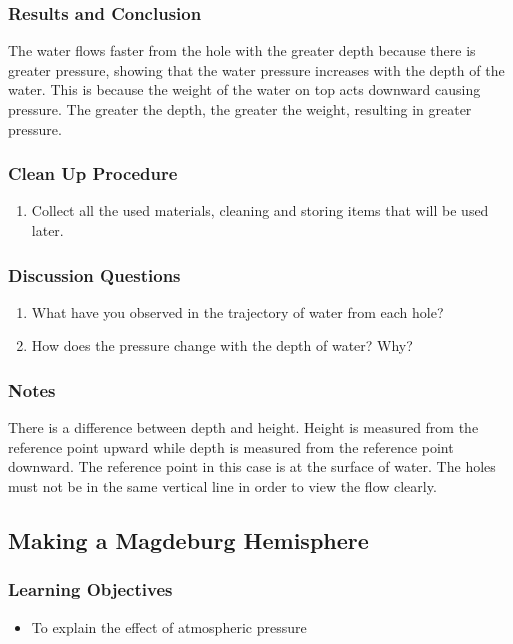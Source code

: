 \subsubsection*{Results and Conclusion}
The water flows faster from the hole with the greater depth because there is greater pressure, showing that the water pressure increases with the depth of the water. This is because the weight of the water on top acts downward causing pressure. The greater the depth, the greater the weight, resulting in greater pressure.  

\subsubsection*{Clean Up Procedure}
\begin{enumerate}
\item{Collect all the used materials, cleaning and storing items that will be used later.  } 
\end{enumerate}

\subsubsection*{Discussion Questions}
\begin{enumerate}
\item{What have you observed in the trajectory of water from each hole?}
\item{How does the pressure change with the depth of water? Why?}
\end{enumerate}

\subsubsection*{Notes}
There is a difference between depth and height. Height is measured from the reference point upward while depth is measured from the reference point downward. The reference point in this case is at the surface of water. The holes must not be in the same vertical line in order to view the flow clearly.  

\subsection{Making a Magdeburg Hemisphere}

\subsubsection*{Learning Objectives}
\begin{itemize}
\item{To explain the effect of atmospheric pressure} 
\end{itemize}

